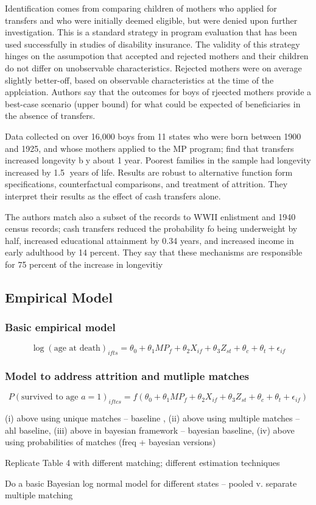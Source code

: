 \documentclass[12pt]{article}
\begin{document}
Identification comes from comparing children of mothers who applied for transfers and who were initially deemed eligible, but were denied upon further investigation.  This is a standard strategy in program evaluation that has been used successfully in studies of disability insurance.  The validity of this strategy hinges on the assumpotion that accepted and rejected mothers and their children do not differ on unobservable characteristics.  Rejected mothers were on average slightly better-off, based on observable characteristics at the time of the applciation.    Authors say that the outcomes for boys of rjeected mothers provide a best-case scenario (upper bound) for what could be expected of beneficiaries in the absence of transfers.  

Data collected on over 16,000 boys from 11 states who were born between 1900 and 1925, and whose mothers applied to the MP program; find that transfers increased longevity by about 1 year.  Poorest families in the sample had longevity increased by 1.5 years of life.  Results are robust to alternative function form specifications, counterfactual comparisons, and treatment of attrition.  They interpret their results as the effect of cash transfers alone.  

The authors match also a subset of the records to WWII enlistment and 1940 census records; cash transfers reduced the probability fo being underweight by half, increased educational attainment by 0.34 years, and increased income in early adulthood by 14 percent.  They say that these mechanisms are responsible for 75 percent of the increase in longevitiy

\subsection{Empirical Model}

\subsubsection*{Basic empirical model}
\begin{equation}
\log(\text{age at death})_{ifts} = \theta_0 +  \theta_1 MP_f + \theta_2 X_{if} + \theta_3 Z_{st} + \theta_c + \theta_t + \epsilon_{if} 
\end{equation}
\subsubsection*{Model to address attrition and mutliple matches}
\begin{equation}
P(\text{survived to age $a = 1$})_{iftcs} = f(\theta_0 + \theta_1 MP_f + \theta_2 X_{if} + \theta_3 Z_{st} + \theta_c + \theta_t + \epsilon_{if}) 
\end{equation}

(i) above using unique matches -- baseline , (ii) above using multiple matches -- ahl baseline, (iii) above in bayesian framework -- bayesian baseline, (iv) above using probabilities of matches (freq + bayesian versions)

Replicate Table 4 with different matching; different estimation techniques 

Do a basic Bayesian log normal model for different states -- pooled v. separate
multiple matching
\end{document}
